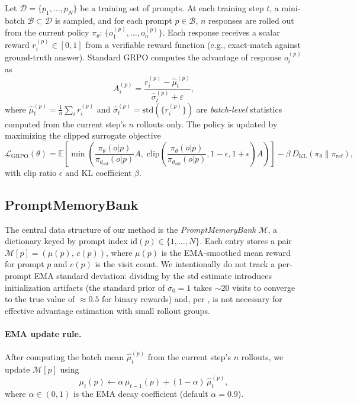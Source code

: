 \documentclass[11pt]{article}
\theoremstyle{definition}
\begin{document}
Let $\mathcal{D} = \{p_1, \ldots, p_N\}$ be a training set of prompts.
At each training step $t$, a mini-batch $\mathcal{B} \subset \mathcal{D}$ is
sampled, and for each prompt $p \in \mathcal{B}$, $n$ responses are rolled out
from the current policy $\pi_\theta$:
$\{o_1^{(p)}, \ldots, o_n^{(p)}\}$.
Each response receives a scalar reward $r_i^{(p)} \in [0,1]$ from a verifiable
reward function (e.g., exact-match against ground-truth answer).
Standard GRPO computes the advantage of response $o_i^{(p)}$ as
\begin{equation}
  A_i^{(p)} = \frac{r_i^{(p)} - \hat{\mu}_t^{(p)}}{\hat{\sigma}_t^{(p)} + \varepsilon},
  \label{eq:grpo_adv}
\end{equation}
where $\hat{\mu}_t^{(p)} = \frac{1}{n}\sum_i r_i^{(p)}$ and
$\hat{\sigma}_t^{(p)} = \mathrm{std}(\{r_i^{(p)}\})$ are \emph{batch-level}
statistics computed from the current step's $n$ rollouts only.
The policy is updated by maximizing the clipped surrogate objective
\begin{equation}
  \mathcal{L}_{\text{GRPO}}(\theta) =
  \mathbb{E}\!\left[\min\!\left(
    \frac{\pi_\theta(o|p)}{\pi_{\theta_{\text{old}}}(o|p)} A,\;
    \mathrm{clip}\!\left(\frac{\pi_\theta(o|p)}{\pi_{\theta_{\text{old}}}(o|p)},
      1\!-\!\epsilon, 1\!+\!\epsilon\right) A
  \right)\right]
  - \beta\, D_{\mathrm{KL}}(\pi_\theta \| \pi_{\mathrm{ref}}),
  \label{eq:grpo_obj}
\end{equation}
with clip ratio $\epsilon$ and KL coefficient $\beta$.

\subsection{PromptMemoryBank}
\label{sec:pmb}

The central data structure of our method is the \emph{PromptMemoryBank}
$\mathcal{M}$, a dictionary keyed by prompt index $\mathrm{id}(p) \in \{1,\ldots,N\}$.
Each entry stores a pair
$\mathcal{M}[p] = (\mu(p),\, c(p))$,
where $\mu(p)$ is the EMA-smoothed mean reward for prompt $p$ and $c(p)$
is the visit count.
We intentionally do not track a per-prompt EMA standard deviation:
dividing by the std estimate introduces initialization artifacts (the
standard prior of $\sigma_0=1$ takes $\sim\!20$ visits to converge to the
true value of $\approx\!0.5$ for binary rewards) and, per \citet{liu2025drgrpo},
is not necessary for effective advantage estimation with small rollout groups.

\paragraph{EMA update rule.}
After computing the batch mean $\hat{\mu}_t^{(p)}$ from the current step's
$n$ rollouts, we update $\mathcal{M}[p]$ using
\begin{equation}
  \mu_t(p) \leftarrow \alpha\,\mu_{t-1}(p) + (1-\alpha)\,\hat{\mu}_t^{(p)},
  \label{eq:ema_mean}
\end{equation}
where $\alpha \in (0,1)$ is the EMA decay coefficient (default $\alpha=0.9$).
\end{document}
